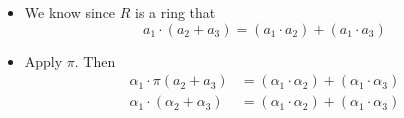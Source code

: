 \documentclass[../notes.tex]{subfiles}
\begin{document}
\begin{itemize}
\begin{itemize}
        \item We know since $R$ is a ring that
        \begin{equation*}
            a_1\cdot(a_2+a_3) = (a_1\cdot a_2)+(a_1\cdot a_3)
        \end{equation*}
        \item Apply $\pi$. Then
        \begin{align*}
            \alpha_1\cdot\pi(a_2+a_3) &= (\alpha_1\cdot\alpha_2)+(\alpha_1\cdot\alpha_3)\\
            \alpha_1\cdot(\alpha_2+\alpha_3) &= (\alpha_1\cdot\alpha_2)+(\alpha_1\cdot\alpha_3)
        \end{align*}
    \end{itemize}
\end{itemize}
\end{document}
